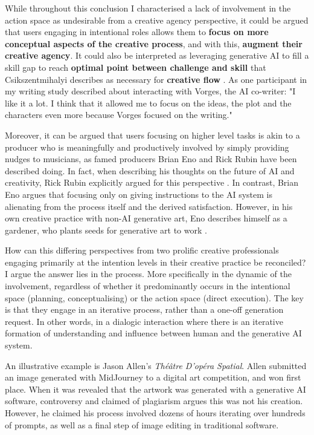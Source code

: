 While throughout this conclusion I characterised a lack of involvement in the action space as undesirable from a creative agency perspective, it could be argued that users engaging in intentional roles allows them to \textbf{focus on more conceptual aspects of the creative process}, and with this, \textbf{augment their creative agency}. It could also be interpreted as leveraging generative AI to fill a skill gap to reach \textbf{optimal point between challenge and skill} that Csikszentmihalyi describes as necessary for \textbf{creative flow} \cite{Csikszentmihalyi1997-ui}. As one participant in my writing study described about interacting with Vorges, the AI co-writer: "I like it a lot. I think that it allowed me to focus on the ideas, the plot and the characters even more because Vorges focused on the writing."

Moreover, it can be argued that users focusing on higher level tasks is akin to a producer who is meaningfully and productively involved by simply providing nudges to musicians, as famed producers Brian Eno and Rick Rubin have been described doing. In fact, when describing his thoughts on the future of AI and creativity, Rick Rubin explicitly argued for this perspective \cite{Rubin2025-sc}. In contrast, Brian Eno argues that focusing only on giving instructions to the AI system is alienating from the process itself and the derived satisfaction. However, in his own creative practice with non-AI generative art, Eno describes himself as a gardener, who plants seeds for generative art to work \cite{Eno2007-fl}. 

How can this differing perspectives from two prolific creative professionals engaging primarily at the intention levels in their creative practice be reconciled? I argue the answer lies in the process. More specifically in the dynamic of the involvement, regardless of whether it predominantly occurs in the intentional space (planning, conceptualising) or the action space (direct execution). The key is that they engage in an iterative process, rather than a one-off generation request. In other words, in a dialogic interaction where there is an iterative formation of understanding and influence between human and the generative AI system. 

An illustrative example is Jason Allen's \textit{Théâtre D'opéra Spatial}. Allen submitted an image generated with MidJourney to a digital art competition, and won first place. When it was revealed that the artwork was generated with a generative AI software, controversy and claimed of plagiarism argues this was not his creation. However, he claimed his process involved dozens of hours iterating over hundreds of prompts, as well as a final step of image editing in traditional software. 

